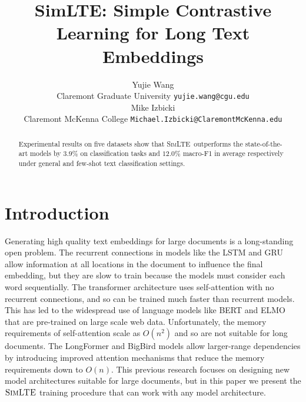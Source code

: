 \documentclass[11pt]{article}
\title{SimLTE: Simple Contrastive Learning for Long Text Embeddings}
\author{Yujie Wang \\
  Claremont Graduate University 
  \texttt{yujie.wang@cgu.edu} \\\And
  Mike Izbicki \\
  Claremont McKenna College
  \texttt{Michael.Izbicki@ClaremontMcKenna.edu} \\}
\newcommand{\our}{\mbox{\textsc{SimLTE}}}
\begin{document}
\maketitle
\begin{abstract}
Experimental results on five datasets show that \our~outperforms the state-of-the-art models by $3.9\%$ on classification tasks and $12.0\%$ macro-F1 in average respectively under general and few-shot text classification settings.


\end{abstract}

\section{Introduction}
Generating high quality text embeddings for large documents is a long-standing open problem.
The recurrent connections in models like the LSTM \cite{} and GRU \cite{} allow information at all locations in the document to influence the final embedding,
but they are slow to train because the models must consider each word sequentially.
The transformer architecture \cite{} uses self-attention with no recurrent connections,
and so can be trained much faster than recurrent models.
This has led to the widespread use of language models like BERT \cite{} and ELMO \cite{} that are pre-trained on large scale web data.
Unfortunately, the memory requirements of self-attention scale as $O(n^2)$ and so are not suitable for long documents.
The LongFormer \cite{} and BigBird \cite{} models allow larger-range dependencies by introducing improved attention mechanisms that reduce the memory requirements down to $O(n)$.
This previous research focuses on designing new model architectures suitable for large documents,
but in this paper we present the $\our$ training procedure that can work with any model architecture.
\end{document}
